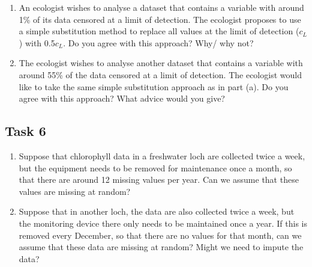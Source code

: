 \documentclass[
  letterpaper,
  DIV=11,
  numbers=noendperiod]{scrartcl}
\begin{document}
\begin{enumerate}
\def\labelenumi{(\alph{enumi})}
\item
  An ecologist wishes to analyse a dataset that contains a variable with
  around 1\% of its data censored at a limit of detection. The ecologist
  proposes to use a simple substitution method to replace all values at
  the limit of detection (\(c_L\)) with 0.5\(c_L\). Do you agree with
  this approach? Why/ why not?
\item
  The ecologist wishes to analyse another dataset that contains a
  variable with around 55\% of the data censored at a limit of
  detection. The ecologist would like to take the same simple
  substitution approach as in part (a). Do you agree with this approach?
  What advice would you give?
\end{enumerate}

\subsection*{Task 6}\label{task-6}

\begin{enumerate}
\def\labelenumi{(\alph{enumi})}
\item
  Suppose that chlorophyll data in a freshwater loch are collected twice
  a week, but the equipment needs to be removed for maintenance once a
  month, so that there are around 12 missing values per year. Can we
  assume that these values are missing at random?
\item
  Suppose that in another loch, the data are also collected twice a
  week, but the monitoring device there only needs to be maintained once
  a year. If this is removed every December, so that there are no values
  for that month, can we assume that these data are missing at random?
  Might we need to impute the data?
\end{enumerate}
\end{document}
